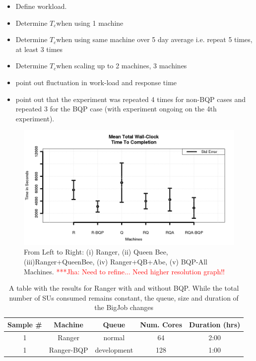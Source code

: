 \documentclass[conference,final]{IEEEtran}
\newcommand{\tc}{$T_c$}
\newcommand{\jhanote}[1]{ {\textcolor{red} { ***Jha: #1 }}}
\newcommand{\jhanote}[1]{}
\begin{document}
\begin{itemize}
\item Define workload.
\item Determine  \tc when using 1 machine 
\item Determine \tc when using same machine over 5 day average i.e. repeat 5    times, at least 3 times
\item Determine \tc when scaling up to 2 machines, 3 machines 
\item point out fluctuation in work-load and response time
\item point out that the experiment was repeated 4 times for non-BQP
  cases and repeated 3 for the BQP case (with experiment ongoing on
  the 4th experiment).
\end{itemize}

\begin{figure}
\begin{center}
\includegraphics[scale=0.35]{./figures/Figure7.png}
\end{center}
\caption{From Left to Right: (i) Ranger, (ii) Queen Bee,
  (iii)Ranger+QueenBee, (iv) Ranger+QB+Abe, (v) BQP-All
  Machines. \jhanote{ Need to refine... Need higher resolution graph!!}}
\label{fig:application_architecture}
\end{figure}

\begin{table}
\begin{tabular}{|c|c|c|c|c|}
\hline Sample \# & Machine & Queue & Num. Cores & Duration (hrs) \\ 
\hline 1 & Ranger & normal & 64 & 2:00 \\ 
\hline 1 & Ranger-BQP & development & 128 & 1:00 \\ 
\hline 
\end{tabular} 
\caption{A table with the results for Ranger with and without BQP. While the
    total number of SUs consumed remains constant, the queue, size and duration
    of the BigJob changes}
\end{table}
\end{document}
